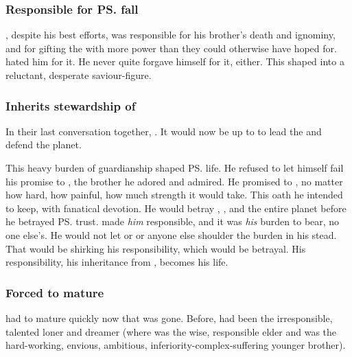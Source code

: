 \subsubsection{Responsible for \ps{\Nexagglachel} fall}
\Ishnaruchaefir{}, despite his best efforts, was responsible for his brother's death and ignominy, and for gifting the \resphain{} with more power than they could otherwise have hoped for. 
\HriistD{} hated him for it.
He never quite forgave himself for it, either. 
This shaped \Ishnaruchaefir{} into a reluctant, desperate saviour-figure.





\subsubsection{Inherits stewardship of \Miith}
In their last conversation together, \Nexagglachel{} . 
It would now be up to \Ishnaruchaefir{} to lead the \dragons{} and defend the planet. 

This heavy burden of guardianship shaped \ps{\Ishnaruchaefir} life. 
He refused to let himself fail his promise to \Nexagglachel, the brother he adored and admired. 
He promised to , no matter how hard, how painful, how much strength it would take. 
This oath he intended to keep, with fanatical devotion. 
He would betray \Rystessakhin, \Secherdamon, \Nzessuacrith{} and the entire planet before he betrayed \ps{\Nexagglachel} trust. 
\Nexagglachel{} made \emph{him} responsible, and it was \emph{his} burden to bear, no one else's. 
He would not let \Rystessakhin{} or \Secherdamon{} or anyone else shoulder the burden in his stead. 
That would be shirking his responsibility, which would be betrayal. 
His responsibility, his inheritance from \Nexagglachel, becomes his life. 





\subsubsection{Forced to mature}
\Ishnaruchaefir had to mature quickly now that \Nexagglachel was gone. 
Before, \Ishnaruchaefir had been the irresponsible, talented loner and dreamer (where \Nexagglachel was the wise, responsible elder and \Secherdamon was the hard-working, envious, ambitious, inferiority-complex-suffering younger brother). 

